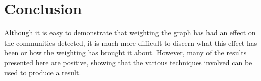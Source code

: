 




\section*{Conclusion}

Although it is easy to demonstrate that weighting the graph has had an effect on the communities detected, it is much more difficult to discern what this effect has been or how the weighting has brought it about.
However, many of the results presented here are positive, showing that the various techniques involved can be used to produce a result.

